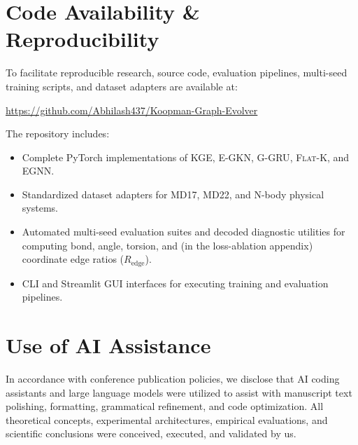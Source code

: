 \documentclass{article}
\newcommand{\GKE}{\textsc{KGE}}
\newcommand{\EGKN}{\textsc{E-GKN}}
\newcommand{\EGNN}{\textsc{EGNN}}
\newcommand{\GGRU}{\textsc{G-GRU}}
\newcommand{\FKoop}{\textsc{Flat-K}}
\begin{document}
\section{Code Availability \& Reproducibility}
\label{app:code_reproducibility}

To facilitate reproducible research, source code, evaluation pipelines, multi-seed training scripts, and dataset adapters are available at:

\begin{center}
\url{https://github.com/Abhilash437/Koopman-Graph-Evolver}
\end{center}

The repository includes:
\begin{itemize}
  \item Complete PyTorch implementations of \GKE{}, \EGKN{}, \GGRU{}, \FKoop{}, and \EGNN{}.
  \item Standardized dataset adapters for MD17, MD22, and N-body physical systems.
  \item Automated multi-seed evaluation suites and decoded diagnostic utilities for computing bond, angle, torsion, and (in the loss-ablation appendix) coordinate edge ratios ($R_{\text{edge}}$).
  \item CLI and Streamlit GUI interfaces for executing training and evaluation pipelines.
\end{itemize}

\section{Use of AI Assistance}
\label{app:ai_assistance}

In accordance with conference publication policies, we disclose that AI coding assistants and large language models were utilized to assist with manuscript text polishing, formatting, grammatical refinement, and code optimization. All theoretical concepts, experimental architectures, empirical evaluations, and scientific conclusions were conceived, executed, and validated by us.
\end{document}
